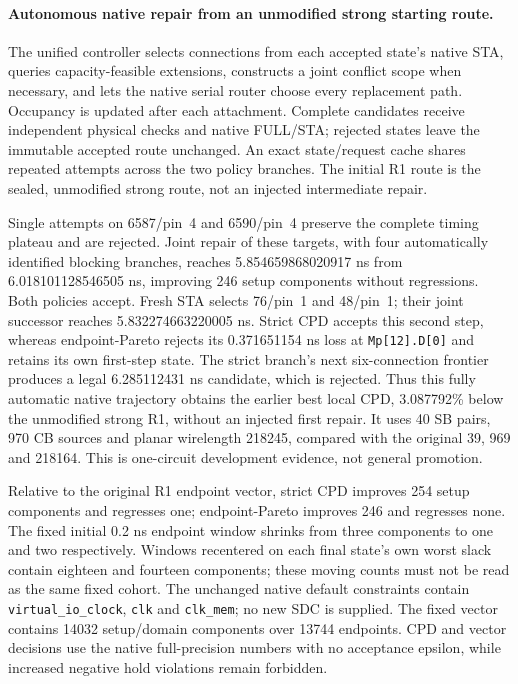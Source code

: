 \paragraph{Autonomous native repair from an unmodified strong starting route.}
The unified controller selects connections from each accepted state's native STA, queries capacity-feasible extensions, constructs a joint conflict scope when necessary, and lets the native serial router choose every replacement path. Occupancy is updated after each attachment. Complete candidates receive independent physical checks and native FULL/STA; rejected states leave the immutable accepted route unchanged. An exact state/request cache shares repeated attempts across the two policy branches. The initial R1 route is the sealed, unmodified strong route, not an injected intermediate repair.

Single attempts on 6587/pin~4 and 6590/pin~4 preserve the complete timing plateau and are rejected. Joint repair of these targets, with four automatically identified blocking branches, reaches 5.854659868020917 ns from 6.018101128546505 ns, improving 246 setup components without regressions. Both policies accept. Fresh STA selects 76/pin~1 and 48/pin~1; their joint successor reaches 5.832274663220005 ns. Strict CPD accepts this second step, whereas endpoint-Pareto rejects its 0.371651154 ns loss at \texttt{Mp[12].D[0]} and retains its own first-step state. The strict branch's next six-connection frontier produces a legal 6.285112431 ns candidate, which is rejected. Thus this fully automatic native trajectory obtains the earlier best local CPD, 3.087792\% below the unmodified strong R1, without an injected first repair. It uses 40 SB pairs, 970 CB sources and planar wirelength 218245, compared with the original 39, 969 and 218164. This is one-circuit development evidence, not general promotion.

Relative to the original R1 endpoint vector, strict CPD improves 254 setup components and regresses one; endpoint-Pareto improves 246 and regresses none. The fixed initial 0.2 ns endpoint window shrinks from three components to one and two respectively. Windows recentered on each final state's own worst slack contain eighteen and fourteen components; these moving counts must not be read as the same fixed cohort. The unchanged native default constraints contain \texttt{virtual\_io\_clock}, \texttt{clk} and \texttt{clk\_mem}; no new SDC is supplied. The fixed vector contains 14032 setup/domain components over 13744 endpoints. CPD and vector decisions use the native full-precision numbers with no acceptance epsilon, while increased negative hold violations remain forbidden.

